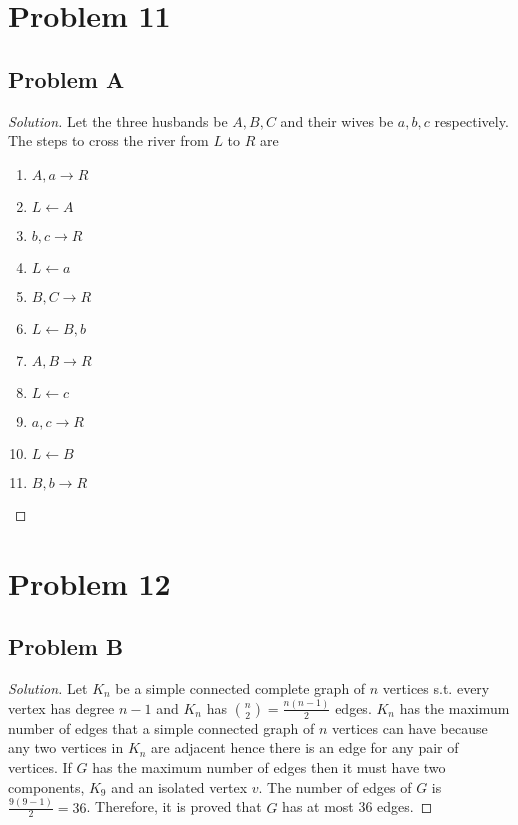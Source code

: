 \documentclass[12pt]{article}
\newenvironment{solution}{\begin{proof}[Solution]}{\end{proof}}
\begin{document}
\section*{Problem 11}
\subsection*{Problem A}
\begin{solution}
    Let the three husbands be \(A,B,C\) and their wives be \(a,b,c\) respectively.
    The steps to cross the river from \(L\) to \(R\) are
    \begin{enumerate}
        \item \(A,a\rightarrow R\)
        \item \(L\leftarrow A\)
        \item \(b,c\rightarrow R\)
        \item \(L\leftarrow a\)
        \item \(B,C\rightarrow R\)
        \item \(L\leftarrow B,b\)
        \item \(A,B\rightarrow R\)
        \item \(L\leftarrow c\)
        \item \(a,c\rightarrow R\)
        \item \(L\leftarrow B\)
        \item \(B,b\rightarrow R\)
    \end{enumerate}
\end{solution}

\section*{Problem 12}
\subsection*{Problem B}
\begin{solution}
    Let \(K_n\) be a simple connected complete graph of \(n\) vertices s.t.
    every vertex has degree \(n-1\) and \(K_n\) has \(\binom{n}{2}=\frac{n(n-1)}{2}\)
    edges. \(K_n\) has the maximum number of edges that a simple connected graph
    of \(n\) vertices can have because any two vertices in \(K_n\) are adjacent
    hence there is an edge for any pair of vertices. If \(G\) has the maximum
    number of edges then it must have two components, \(K_9\) and an isolated
    vertex \(v\). The number of edges of \(G\) is \(\frac{9(9-1)}{2}=36\).
    Therefore, it is proved that \(G\) has at most 36 edges.
\end{solution}
\end{document}
